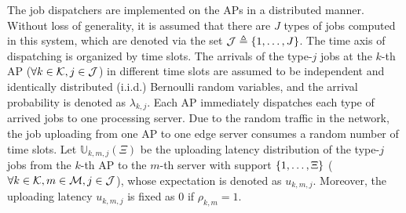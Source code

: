 The job dispatchers are implemented on the APs in a distributed manner.
Without loss of generality, it is assumed that there are $J$ types of jobs computed in this system, which are denoted via the set $\mathcal{J} \triangleq \{1,\dots,J\}$.
The time axis of dispatching is organized by time slots.
The arrivals of the type-$j$ jobs at the $k$-th AP ($\forall k\in\mathcal{K},j\in\mathcal{J}$) in different time slots are assumed to be independent and identically distributed (i.i.d.) Bernoulli random variables, and the arrival probability is denoted as $\lambda_{k,j}$.
Each AP immediately dispatches each type of arrived jobs to one processing server.
Due to the random traffic in the network, the job uploading from one AP to one edge server consumes a random number of time slots.
Let $\mathbb{U}_{k,m,j}(\Xi)$ be the uploading latency distribution of the type-$j$ jobs from the $k$-th AP to the $m$-th server with support $\{1, \dots, \Xi\}$ ($\forall k\in\mathcal{K}, m\in\mathcal{M}, j\in\mathcal{J}$), whose expectation is denoted as $u_{k,m,j}$.
Moreover, the uploading latency $u_{k,m,j}$ is fixed as $0$ if $\rho_{k,m}=1$.

